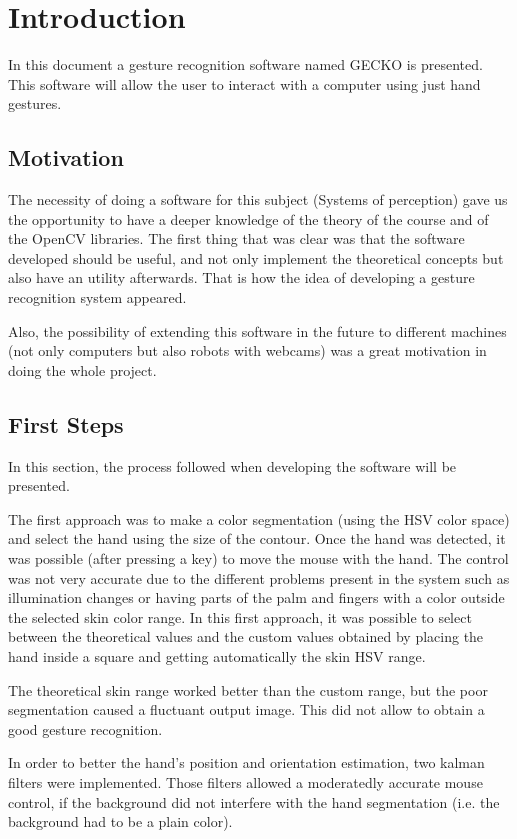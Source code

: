 \section{Introduction}
In this document a gesture recognition software named GECKO is presented. This software will allow the user to interact with a computer using just hand gestures. 

\subsection{Motivation}
The necessity of doing a software for this subject (Systems of perception) gave us the opportunity to have a deeper knowledge of the theory of the course and of the OpenCV libraries. The first thing that was clear was that the software developed should be useful, and not only implement the theoretical concepts but also have an utility afterwards. That is how the idea of developing a gesture recognition system appeared. 

Also, the possibility of extending this software in the future to different machines (not only computers but also robots with webcams) was a great motivation in doing the whole project. 


\subsection{First Steps}
In this section, the process followed when developing the software will be presented. 

The first approach was to make a color segmentation (using the HSV color space) and select the hand using the size of the contour. Once the hand was detected, it was possible (after pressing a key) to move the mouse with the hand. The control was not very accurate due to the different problems present in the system such as illumination changes or having parts of the palm and fingers with a color outside the selected skin color range. In this first approach, it was possible to select between the theoretical values and the custom values obtained by placing the hand inside a square and getting automatically the skin HSV range. 

The theoretical skin range worked better than the custom range, but the poor segmentation caused a fluctuant output image. This  did not allow to obtain a good gesture recognition.   

In order to better the hand's position and orientation estimation, two kalman filters were implemented. Those filters allowed a moderatedly accurate mouse control, if the background did not interfere with the hand segmentation (i.e. the background had to be a plain color). 

